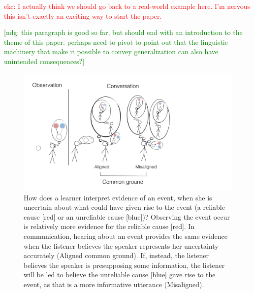 \documentclass[10pt,letterpaper]{article}
\newcommand{\red}[1]{\textcolor{Red}{#1}}
\newcommand{\ndg}[1]{\textcolor{Green}{[ndg: #1]}}
\begin{document}
\red{ekc: I actually think we should go back to a real-world example here.  I'm nervous this isn't exactly an exciting way to start the paper.}

\ndg{this paragraph is good so far, but should end with an introduction to the theme of this paper. perhaps need to pivot to point out that the linguistic machinery that make it possible to convey generalization can also have unintended consequences?}
\begin{figure}
\centering
    \includegraphics[width=\columnwidth]{cartoon-2}
    \caption{
        \small
How does a learner interpret evidence of an event, when she is uncertain about what could have given rise to the event (a reliable cause [red] or an unreliable cause [blue])? 
   Observing the event occur is relatively more evidence for the reliable cause [red]. 
    In communication, hearing about an event provides the same evidence when the listener believes the speaker represents her uncertainty accurately (Aligned common ground).
   If, instead, the listener believes the speaker is presupposing some information, the listener will be led to believe the unreliable cause [blue] gave rise to the event, as that is a more informative utterance (Misaligned).
    }
  \label{fig:cartoon}
\end{figure}
\end{document}
